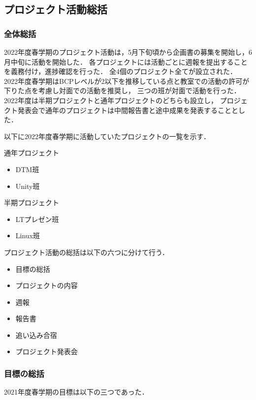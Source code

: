 \subsection*{プロジェクト活動総括}


\subsubsection*{全体総括}
2022年度春学期のプロジェクト活動は，5月下旬頃から企画書の募集を開始し，6月中旬に活動を開始した．
各プロジェクトには活動ごとに週報を提出することを義務付け，進捗確認を行った．
全4個のプロジェクト全てが設立された．
2022年度春学期はBCPレベルが2以下を推移している点と教室での活動の許可が下りた点を考慮し対面での活動を推奨し，
三つの班が対面で活動を行った．
2022年度は半期プロジェクトと通年プロジェクトのどちらも設立し，
プロジェクト発表会で通年のプロジェクトは中間報告書と途中成果を発表することとした．

以下に2022年度春学期に活動していたプロジェクトの一覧を示す．

通年プロジェクト
\begin{itemize}
  \item DTM班
  \item Unity班
\end{itemize}

半期プロジェクト
\begin{itemize}
  \item LTプレゼン班
  \item Linux班
\end{itemize}

プロジェクト活動の総括は以下の六つに分けて行う．

\begin{itemize}
  \item 目標の総括
  \item プロジェクトの内容
  \item 週報
  \item 報告書
  \item 追い込み合宿
  \item プロジェクト発表会
\end{itemize}

\subsubsection*{目標の総括}
2021年度春学期の目標は以下の三つであった．

